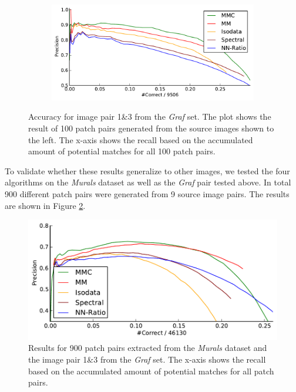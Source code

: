 \begin{figure}[htb]
\begin{subfigure}[c]{0.2\textwidth}
	\end{subfigure}%
	~ %
	\begin{subfigure}[c]{0.8\textwidth}
	\centering
	\includegraphics[width=\columnwidth]{images/result_graf}
	\end{subfigure}%
	\caption{Accuracy for image pair 1\&3 from the \emph{Graf} set. The 
	plot shows the result of 100 patch pairs generated from the source 
	images shown to the left. The x-axis shows the recall based on the 
accumulated amount of potential matches for all 100 patch pairs. }
	\label{fig:result_graf}
\end{figure}

To validate whether these results generalize to other images, we tested 
the four algorithms on the \emph{Murals} dataset as well as the 
\emph{Graf} pair tested above.  In total 900 different patch pairs were 
generated from 9 source image pairs.  The results are shown in Figure 
\ref{fig:result_accumulated}. 

\begin{figure}[htb]
	\centering
	\includegraphics[width=\columnwidth]{images/result_accumulated}
	\caption{Results for 900 patch pairs extracted from the 
	\emph{Murals} dataset and the image pair 1\&3 from the \emph{Graf} 
	set.  The x-axis shows the recall based on the accumulated amount of 
potential matches for all patch pairs.}
	\label{fig:result_accumulated}
\end{figure}

